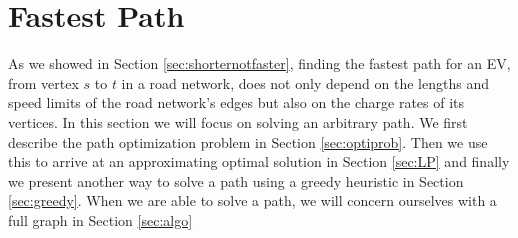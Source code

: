 \section{Fastest Path}
As we showed in Section \ref{sec:shorternotfaster}, finding the fastest path for an EV, from vertex $s$ to $t$ in a road network, does not only depend on the lengths and speed limits of the road network's edges but also on the charge rates of its vertices. In this section we will focus on solving an arbitrary path. We first describe the path optimization problem in Section \ref{sec:optiprob}. Then we use this to arrive at an approximating optimal solution in Section \ref{sec:LP} and finally we present another way to solve a path using a greedy heuristic in Section \ref{sec:greedy}. When we are able to solve a path, we will concern ourselves with a full graph in Section \ref{sec:algo}
